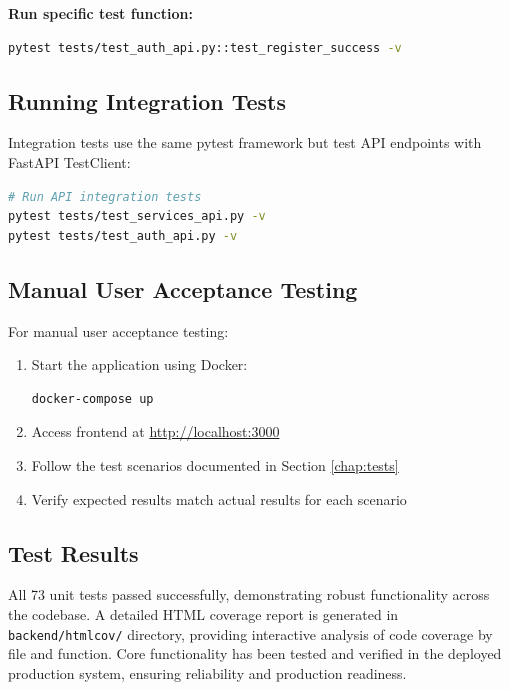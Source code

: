\documentclass[12pt,a4paper]{report}
\begin{document}
\textbf{Run specific test function:}
\begin{lstlisting}[language=bash]
pytest tests/test_auth_api.py::test_register_success -v
\end{lstlisting}

\subsection{Running Integration Tests}

Integration tests use the same pytest framework but test API endpoints with FastAPI TestClient:

\begin{lstlisting}[language=bash]
# Run API integration tests
pytest tests/test_services_api.py -v
pytest tests/test_auth_api.py -v
\end{lstlisting}

\subsection{Manual User Acceptance Testing}

For manual user acceptance testing:

\begin{enumerate}
    \item Start the application using Docker:
          \begin{lstlisting}[language=bash]
docker-compose up
    \end{lstlisting}

    \item Access frontend at \url{http://localhost:3000}
    \item Follow the test scenarios documented in Section \ref{chap:tests}
    \item Verify expected results match actual results for each scenario
\end{enumerate}

\subsection{Test Results}

All 73 unit tests passed successfully, demonstrating robust functionality across the codebase. A detailed HTML coverage report is generated in \texttt{backend/htmlcov/} directory, providing interactive analysis of code coverage by file and function. Core functionality has been tested and verified in the deployed production system, ensuring reliability and production readiness.
\end{document}
